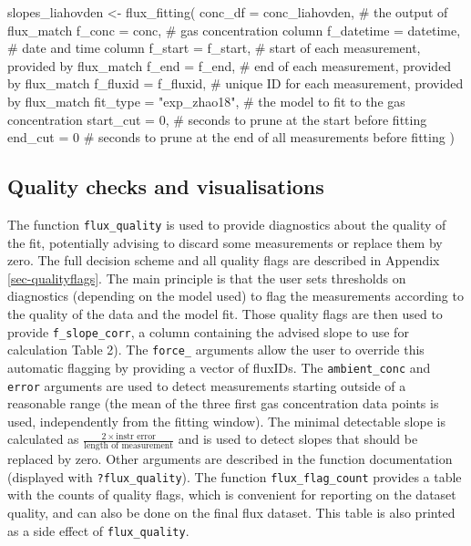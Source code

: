 \documentclass[
  letterpaper,
  DIV=11,
  numbers=noendperiod]{scrartcl}
\newenvironment{Shaded}{\begin{snugshade}}{\end{snugshade}}
\newcommand{\AttributeTok}[1]{\textcolor[rgb]{0.40,0.45,0.13}{#1}}
\newcommand{\CommentTok}[1]{\textcolor[rgb]{0.37,0.37,0.37}{#1}}
\newcommand{\DecValTok}[1]{\textcolor[rgb]{0.68,0.00,0.00}{#1}}
\newcommand{\FunctionTok}[1]{\textcolor[rgb]{0.28,0.35,0.67}{#1}}
\newcommand{\NormalTok}[1]{\textcolor[rgb]{0.00,0.23,0.31}{#1}}
\newcommand{\OtherTok}[1]{\textcolor[rgb]{0.00,0.23,0.31}{#1}}
\newcommand{\StringTok}[1]{\textcolor[rgb]{0.13,0.47,0.30}{#1}}
\begin{document}
\begin{Shaded}
\begin{Highlighting}[]
\NormalTok{slopes\_liahovden }\OtherTok{\textless{}{-}} \FunctionTok{flux\_fitting}\NormalTok{(}
  \AttributeTok{conc\_df =}\NormalTok{ conc\_liahovden, }\CommentTok{\# the output of flux\_match}
  \AttributeTok{f\_conc =}\NormalTok{ conc, }\CommentTok{\# gas concentration column}
  \AttributeTok{f\_datetime =}\NormalTok{ datetime, }\CommentTok{\# date and time column}
  \AttributeTok{f\_start =}\NormalTok{ f\_start, }\CommentTok{\# start of each measurement, provided by flux\_match}
  \AttributeTok{f\_end =}\NormalTok{ f\_end, }\CommentTok{\# end of each measurement, provided by flux\_match}
  \AttributeTok{f\_fluxid =}\NormalTok{ f\_fluxid, }\CommentTok{\# unique ID for each measurement, provided by flux\_match}
  \AttributeTok{fit\_type =} \StringTok{"exp\_zhao18"}\NormalTok{, }\CommentTok{\# the model to fit to the gas concentration}
  \AttributeTok{start\_cut =} \DecValTok{0}\NormalTok{, }\CommentTok{\# seconds to prune at the start before fitting}
  \AttributeTok{end\_cut =} \DecValTok{0} \CommentTok{\# seconds to prune at the end of all measurements before fitting}
\NormalTok{)}
\end{Highlighting}
\end{Shaded}

\subsection{Quality checks and
visualisations}\label{quality-checks-and-visualisations}

The function \texttt{flux\_quality} is used to provide diagnostics about
the quality of the fit, potentially advising to discard some
measurements or replace them by zero. The full decision scheme and all
quality flags are described in Appendix \ref{sec-qualityflags}. The main
principle is that the user sets thresholds on diagnostics (depending on
the model used) to flag the measurements according to the quality of the
data and the model fit. Those quality flags are then used to provide
\texttt{f\_slope\_corr}, a column containing the advised slope to use
for calculation Table 2). The \texttt{force\_} arguments allow the user
to override this automatic flagging by providing a vector of fluxIDs.
The \texttt{ambient\_conc} and \texttt{error} arguments are used to
detect measurements starting outside of a reasonable range (the mean of
the three first gas concentration data points is used, independently
from the fitting window). The minimal detectable slope is calculated as
\(\frac{2 \times \text{instr error}}{\text{length of measurement}}\) and
is used to detect slopes that should be replaced by zero. Other
arguments are described in the function documentation (displayed with
\texttt{?flux\_quality}). The function \texttt{flux\_flag\_count}
provides a table with the counts of quality flags, which is convenient
for reporting on the dataset quality, and can also be done on the final
flux dataset. This table is also printed as a side effect of
\texttt{flux\_quality}.
\end{document}
